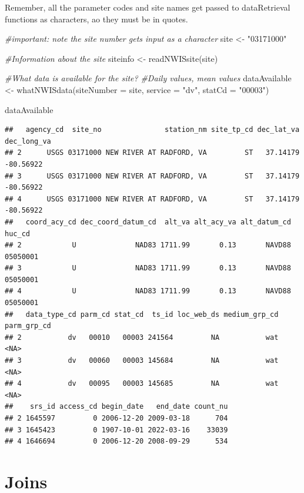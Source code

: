\documentclass[
]{book}
\newenvironment{Shaded}{\begin{snugshade}}{\end{snugshade}}
\newcommand{\AttributeTok}[1]{\textcolor[rgb]{0.77,0.63,0.00}{#1}}
\newcommand{\CommentTok}[1]{\textcolor[rgb]{0.56,0.35,0.01}{\textit{#1}}}
\newcommand{\FunctionTok}[1]{\textcolor[rgb]{0.00,0.00,0.00}{#1}}
\newcommand{\NormalTok}[1]{#1}
\newcommand{\OtherTok}[1]{\textcolor[rgb]{0.56,0.35,0.01}{#1}}
\newcommand{\StringTok}[1]{\textcolor[rgb]{0.31,0.60,0.02}{#1}}
\begin{document}
Remember, all the parameter codes and site names get passed to dataRetrieval functions as characters, ao they must be in quotes.

\begin{Shaded}
\begin{Highlighting}[]
\CommentTok{\#important: note the site number gets input as a character}
\NormalTok{site }\OtherTok{\textless{}{-}} \StringTok{"03171000"}

\CommentTok{\#Information about the site}
\NormalTok{siteinfo }\OtherTok{\textless{}{-}} \FunctionTok{readNWISsite}\NormalTok{(site)}

\CommentTok{\#What data is available for the site?}
\CommentTok{\#Daily values, mean values}
\NormalTok{dataAvailable }\OtherTok{\textless{}{-}} \FunctionTok{whatNWISdata}\NormalTok{(}\AttributeTok{siteNumber =}\NormalTok{ site, }\AttributeTok{service =} \StringTok{"dv"}\NormalTok{, }\AttributeTok{statCd =} \StringTok{"00003"}\NormalTok{)}

\NormalTok{dataAvailable}
\end{Highlighting}
\end{Shaded}

\begin{verbatim}
##   agency_cd  site_no               station_nm site_tp_cd dec_lat_va dec_long_va
## 2      USGS 03171000 NEW RIVER AT RADFORD, VA         ST   37.14179   -80.56922
## 3      USGS 03171000 NEW RIVER AT RADFORD, VA         ST   37.14179   -80.56922
## 4      USGS 03171000 NEW RIVER AT RADFORD, VA         ST   37.14179   -80.56922
##   coord_acy_cd dec_coord_datum_cd  alt_va alt_acy_va alt_datum_cd   huc_cd
## 2            U              NAD83 1711.99       0.13       NAVD88 05050001
## 3            U              NAD83 1711.99       0.13       NAVD88 05050001
## 4            U              NAD83 1711.99       0.13       NAVD88 05050001
##   data_type_cd parm_cd stat_cd  ts_id loc_web_ds medium_grp_cd parm_grp_cd
## 2           dv   00010   00003 241564         NA           wat        <NA>
## 3           dv   00060   00003 145684         NA           wat        <NA>
## 4           dv   00095   00003 145685         NA           wat        <NA>
##    srs_id access_cd begin_date   end_date count_nu
## 2 1645597         0 2006-12-20 2009-03-18      704
## 3 1645423         0 1907-10-01 2022-03-16    33039
## 4 1646694         0 2006-12-20 2008-09-29      534
\end{verbatim}

\hypertarget{joins}{%
\section{Joins}\label{joins}}
\end{document}
